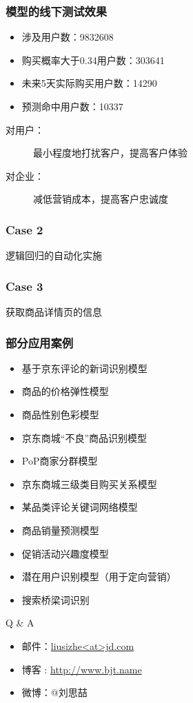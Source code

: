 \documentclass[UTF8,                %
               table,               %
               9pt,                %
               aspectratio=43]      %
               {beamer}
\begin{document}
\begin{frame}
  \frametitle{模型的线下测试效果}
  \begin{itemize}
    \item 涉及用户数：9832608
    \item 购买概率大于0.34用户数：303641
    \item 未来5天实际购买用户数：14290
    \item 预测命中用户数：10337
  \end{itemize}

  \pause
  \begin{description}
    \item[对用户：] 最小程度地打扰客户，\alert{提高客户体验}
    \item[对企业：] 减低营销成本，提高客户忠诚度
  \end{description}
\end{frame}

\begin{frame}
  \frametitle{Case 2}
    逻辑回归的自动化实施
\end{frame}

\begin{frame}
  \frametitle{Case 3}
  获取商品详情页的信息
\end{frame}

\begin{frame}
  \frametitle{部分应用案例}
  \begin{itemize}
    \item 基于京东评论的新词识别模型
    \item 商品的价格弹性模型
    \item 商品性别色彩模型
    \item 京东商城“不良”商品识别模型
    \item PoP商家分群模型
    \item 京东商城三级类目购买关系模型
    \item 某品类评论关键词网络模型
    \item 商品销量预测模型
    \item 促销活动兴趣度模型
    \item \alert{潜在用户识别模型（用于定向营销）}
    \item 搜索桥梁词识别
  \end{itemize}
\end{frame}

\begin{frame}
\begin{center}
  \Huge{Q \& A}
\end{center}

\vspace{1cm}
  \begin{itemize}
     \item 邮件：\href{mailto:sunbjt@gmail.com}{liusizhe\textless at\textgreater jd.com}
     \item 博客 : \url{http://www.bjt.name}
     \item 微博：@刘思喆
  \end{itemize}
\begin{flushright}
\hyperlink{Return}{}
\end{flushright}

\end{frame}
\end{document}
